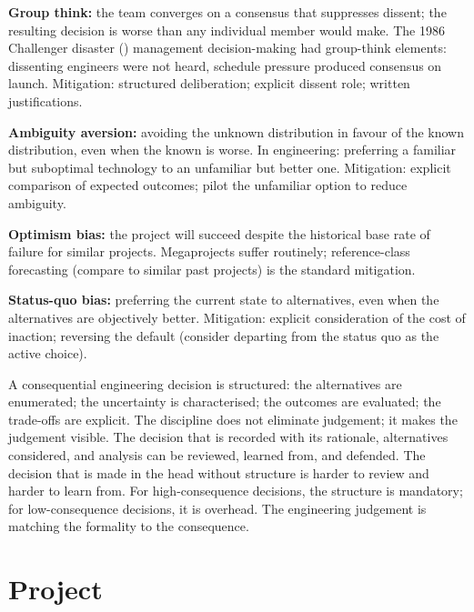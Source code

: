 \textbf{Group think:} the team converges on a consensus that suppresses dissent; the resulting decision is worse than any individual member would make. The 1986 Challenger disaster (\cite{acc:nasa-challenger}) management decision-making had group-think elements: dissenting engineers were not heard, schedule pressure produced consensus on launch. Mitigation: structured deliberation; explicit dissent role; written justifications.

\textbf{Ambiguity aversion:} avoiding the unknown distribution in favour of the known distribution, even when the known is worse. In engineering: preferring a familiar but suboptimal technology to an unfamiliar but better one. Mitigation: explicit comparison of expected outcomes; pilot the unfamiliar option to reduce ambiguity.

\textbf{Optimism bias:} the project will succeed despite the historical base rate of failure for similar projects. Megaprojects suffer routinely; reference-class forecasting (compare to similar past projects) is the standard mitigation.

\textbf{Status-quo bias:} preferring the current state to alternatives, even when the alternatives are objectively better. Mitigation: explicit consideration of the cost of inaction; reversing the default (consider departing from the status quo as the active choice).

\begin{principle}
A consequential engineering decision is structured: the alternatives are enumerated; the uncertainty is characterised; the outcomes are evaluated; the trade-offs are explicit. The discipline does not eliminate judgement; it makes the judgement visible. The decision that is recorded with its rationale, alternatives considered, and analysis can be reviewed, learned from, and defended. The decision that is made in the head without structure is harder to review and harder to learn from. For high-consequence decisions, the structure is mandatory; for low-consequence decisions, it is overhead. The engineering judgement is matching the formality to the consequence.
\end{principle}

\section{Project}


